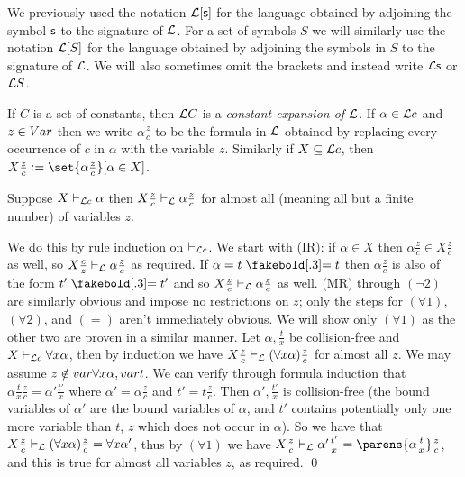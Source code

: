We previously used the notation ${\cal L}[{\sf s}]$ for the language obtained by adjoining the symbol ${\sf s}$ to the signature of ${\cal L}$.
For a set of symbols $S$ we will similarly use the notation ${\cal L}[S]$ for the language obtained by adjoining the symbols in $S$ to the signature of ${\cal L}$.
We will also sometimes omit the brackets and instead write ${\cal L}{\sf s}$ or ${\cal L}S$.

If $C$ is a set of constants, then ${\cal L}C$ is a {\it constant expansion of ${\cal L}$}.
If $\alpha\in{\cal L}c$ and $z\in{\sl Var}$ then we write $\alpha\frac zc$ to be the formula in ${\cal L}$ obtained by replacing every occurrence of $c$ in $\alpha$ with the variable $z$.
Similarly if $X\subseteq{\cal L}c$, then $X\frac zc\coloneqq\set{\alpha\frac zc}[\alpha\in X]$.

\blemm[name=constanteliminationlemma]

    Suppose $X\vdash_{{\cal L}c}\alpha$ then $X\frac zc\vdash_{\cal L}\alpha\frac zc$ for almost all (meaning all but a finite number) of variables $z$.

\elemm

We do this by rule induction on $\vdash_{{\cal L}c}$.
We start with (IR): if $\alpha\in X$ then $\alpha\frac zc\in X\frac zc$ as well, so $X\frac cz\vdash_{\cal L}\alpha\frac zc$ as required.
If $\alpha=t\eq t$ then $\alpha\frac zc$ is also of the form $t'\eq t'$ and so $X\frac zc\vdash_{\cal L}\alpha\frac zc$ as well.
(MR) through $(\neg2)$ are similarly obvious and impose no restrictions on $z$; only the steps for $(\forall1)$, $(\forall2)$, and $(=)$ aren't immediately obvious.
We will show only $(\forall1)$ as the other two are proven in a similar manner.
Let $\alpha,\frac tx$ be collision-free and $X\vdash_{{\cal L}c}\forall x\alpha$, then by induction we have $X\frac zc\vdash_{\cal L}(\forall x\alpha)\frac zc$ for almost all $z$.
We may assume $z\notin{\sl var}\forall x\alpha,{\sl var} t$.
We can verify through formula induction that $\alpha\frac tx\frac zc=\alpha'\frac{t'}x$ where $\alpha'=\alpha\frac zc$ and $t'=t\frac zc$.
Then $\alpha',\frac{t'}x$ is collision-free (the bound variables of $\alpha'$ are the bound variables of $\alpha$, and $t'$ contains potentially only one more variable than $t$, $z$ which does not
occur in $\alpha$).
So we have that $X\frac zc\vdash_{\cal L}(\forall x\alpha)\frac zc=\forall x\alpha'$, thus by $(\forall1)$ we have $X\frac zc\vdash_{\cal L}\alpha'\frac{t'}x=\parens{\alpha\frac tx}\frac zc$, and this is
true for almost all variables $z$, as required.
\qed

